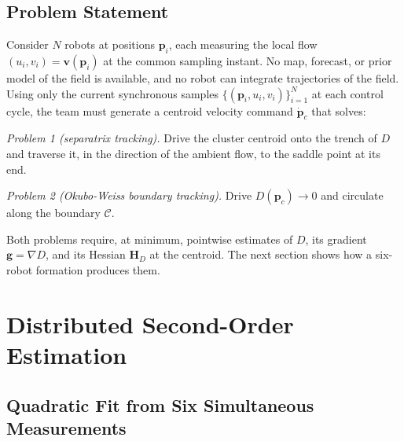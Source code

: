 \documentclass[lettersize,journal]{IEEEtran}
\begin{document}
\subsection{Problem Statement}
\label{sec:problem_statement}

Consider $N$ robots at positions $\mathbf{p}_i$, each measuring the local
flow $(u_i, v_i) = \mathbf{v}(\mathbf{p}_i)$ at the common sampling
instant. No map, forecast, or prior model of the field is available, and
no robot can integrate trajectories of the field. Using only the current
synchronous samples $\{(\mathbf{p}_i, u_i, v_i)\}_{i=1}^{N}$ at each
control cycle, the team must generate a centroid velocity command
$\dot{\mathbf{p}}_c$ that solves:

\emph{Problem 1 (separatrix tracking).} Drive the cluster centroid onto
the trench of $D$ and traverse it, in the direction of the ambient flow,
to the saddle point at its end.

\emph{Problem 2 (Okubo-Weiss boundary tracking).} Drive $D(\mathbf{p}_c)
\to 0$ and circulate along the boundary $\mathcal{C}$.

Both problems require, at minimum, pointwise estimates of $D$, its
gradient $\mathbf{g} = \nabla D$, and its Hessian $\mathbf{H}_D$ at the
centroid. The next section shows how a six-robot formation produces them.


\section{Distributed Second-Order Estimation}
\label{sec:estimation}

\subsection{Quadratic Fit from Six Simultaneous Measurements}
\end{document}
